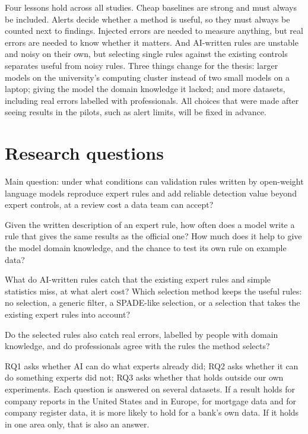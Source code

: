 \documentclass[11pt,a4paper]{article}
\begin{document}
Four lessons hold across all studies. Cheap baselines are strong and must always be included. Alerts decide whether a method is useful, so they must always be counted next to findings. Injected errors are needed to measure anything, but real errors are needed to know whether it matters. And AI-written rules are unstable and noisy on their own, but selecting single rules against the existing controls separates useful from noisy rules. Three things change for the thesis: larger models on the university's computing cluster instead of two small models on a laptop; giving the model the domain knowledge it lacked; and more datasets, including real errors labelled with professionals. All choices that were made after seeing results in the pilots, such as alert limits, will be fixed in advance.

\section{Research questions}

Main question: under what conditions can validation rules written by open-weight language models reproduce expert rules and add reliable detection value beyond expert controls, at a review cost a data team can accept?

\begin{description}[leftmargin=0pt,labelsep=0.5em]
\item[RQ1. Reproduce.] Given the written description of an expert rule, how often does a model write a rule that gives the same results as the official one? How much does it help to give the model domain knowledge, and the chance to test its own rule on example data?
\item[RQ2. Add and select.] What do AI-written rules catch that the existing expert rules and simple statistics miss, at what alert cost? Which selection method keeps the useful rules: no selection, a generic filter, a SPADE-like selection, or a selection that takes the existing expert rules into account?
\item[RQ3. Real errors and professional judgement.] Do the selected rules also catch real errors, labelled by people with domain knowledge, and do professionals agree with the rules the method selects?
\end{description}

RQ1 asks whether AI can do what experts already did; RQ2 asks whether it can do something experts did not; RQ3 asks whether that holds outside our own experiments. Each question is answered on several datasets. If a result holds for company reports in the United States and in Europe, for mortgage data and for company register data, it is more likely to hold for a bank's own data. If it holds in one area only, that is also an answer.
\end{document}
